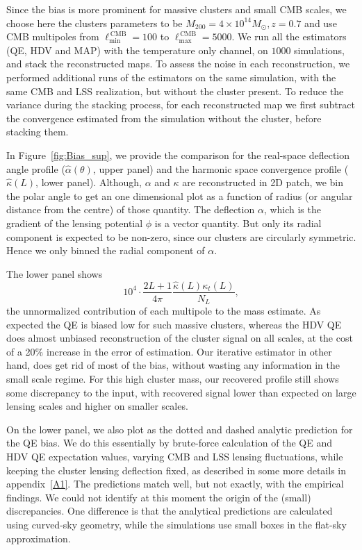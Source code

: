 \documentclass[prd, superscriptaddress, tightenlines, longbibliography, nofootinbib, eqsecnum, amsfonts, amsmath, floatfix, twocolumn, notitlepage]{revtex4-2}
\begin{document}
Since the bias is more prominent for massive clusters and small CMB scales, we choose here the clusters parameters to be $M_{200} = 4 \times 10^{14} M_{\odot}, z=0.7$ and use CMB multipoles from $\ell_{\text{min}}^{\, \text{CMB}}=100$ to $\ell_{\text{max}}^{\, \text{CMB}} = 5000$.
We run all the estimators (QE, HDV and MAP) with the temperature only channel, on $1000$ simulations, and stack the reconstructed maps.
To assess the noise in each reconstruction, we performed additional runs of the estimators on the same simulation, with the same CMB and LSS realization, but without the cluster present. To reduce the variance during the stacking process, for each reconstructed map we first subtract the convergence estimated from the simulation without the cluster, before stacking them.

In Figure~\ref{fig:Bias_sup}, we provide the comparison for the real-space deflection angle profile ($\hat \alpha(\theta)$, upper panel)  and the harmonic space convergence profile ($\hat \kappa(L)$, lower panel). 
Although, $\alpha$ and $\kappa$ are reconstructed in 2D patch, we bin the polar angle to get an one dimensional plot as a function of radius (or angular distance from the centre) of those quantity. 
The deflection $\alpha$, which is the gradient of the lensing potential $\phi$ is a vector quantity. 
But only its radial component is expected to be non-zero, since our clusters are circularly symmetric. 
Hence we only binned the radial component of $\alpha$.

The lower panel shows
\begin{equation}
	10^4\cdot\frac{2L + 1}{4\pi} \frac{\hat \kappa(L) \kappa_t(L)}{N_L},
\end{equation}
the unnormalized contribution of each multipole to the mass estimate. As expected the QE is biased low for such massive clusters, whereas the HDV QE~\cite{Hu:2007bt} does almost unbiased reconstruction of the cluster signal on all scales, at the cost of a 20\% increase in the error of estimation.
Our iterative estimator in other hand, does get rid of most of the bias, without wasting any information in the small scale regime. For this high cluster mass, our recovered profile still shows some discrepancy to the input, with recovered signal lower than expected on large lensing scales and higher on smaller scales.

On the lower panel, we also plot as the dotted and dashed analytic prediction for the QE bias. 
We do this essentially by brute-force calculation of the QE and HDV QE expectation values, varying CMB and LSS lensing fluctuations, while keeping the cluster lensing deflection fixed, as described in some more details in appendix~\ref{A1}.
The predictions match well, but not exactly, with the empirical findings. 
We could not identify at this moment the origin of the (small) discrepancies. 
One difference is that the analytical predictions are calculated using curved-sky geometry, while the simulations use small boxes in the flat-sky approximation.
\end{document}
